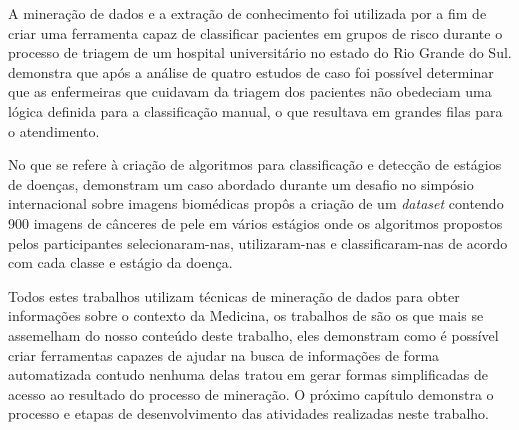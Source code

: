 A mineração de dados e a extração de conhecimento foi utilizada por  a fim de criar uma ferramenta capaz de classificar pacientes em grupos de risco durante o processo de triagem de um hospital universitário no estado do Rio Grande do Sul.  demonstra que após a análise de quatro estudos de caso foi possível determinar que as enfermeiras que cuidavam da triagem dos pacientes não obedeciam uma lógica definida para a classificação manual, o que resultava em grandes filas para o atendimento.

No que se refere à criação de algoritmos para classificação e detecção de estágios de doenças,  demonstram um caso abordado durante um desafio no simpósio internacional sobre imagens biomédicas propôs a criação de um \textit{dataset} contendo 900 imagens de cânceres de pele em vários estágios onde os algoritmos propostos pelos participantes selecionaram-nas, utilizaram-nas e classificaram-nas de acordo com cada classe e estágio da doença.

Todos estes trabalhos utilizam técnicas de mineração de dados para obter informações sobre o contexto da Medicina, os trabalhos de  são os que mais se assemelham do nosso conteúdo deste trabalho, eles demonstram como é possível criar ferramentas capazes de ajudar na busca de informações de forma automatizada contudo nenhuma delas tratou em gerar formas simplificadas de acesso ao resultado do processo de mineração. O próximo capítulo demonstra o processo e etapas de desenvolvimento das atividades realizadas neste trabalho.